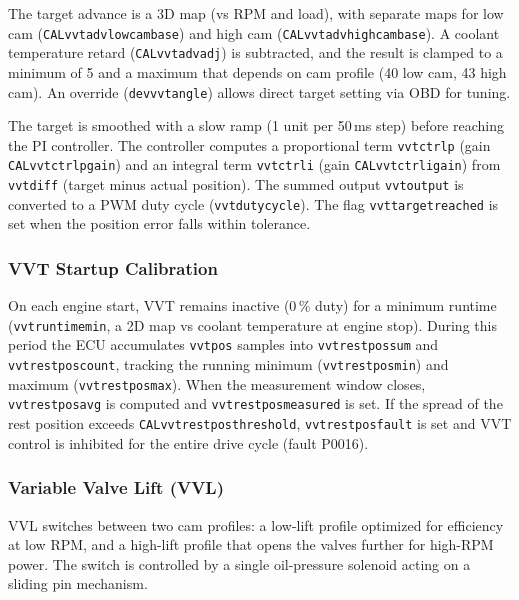 \documentclass[a4paper,11pt]{article}
\renewcommand{\_}{\oldunderscore\allowbreak}
\begin{document}
The target advance is a 3D map (vs RPM and load), with
separate maps for low cam (\texttt{CAL\_vvt\_adv\_low\_cam\_base}) and high
cam (\texttt{CAL\_vvt\_adv\_high\_cam\_base}). A coolant temperature retard
(\texttt{CAL\_vvt\_adv\_adj}) is subtracted, and the result is clamped to a
minimum of 5\textdegree{} and a maximum that depends on cam profile
(40\textdegree{} low cam, 43\textdegree{} high cam). An override
(\texttt{dev\_vvt\_angle}) allows direct target setting via OBD for tuning.

The target is smoothed with a slow ramp (1 unit per 50\,ms step) before
reaching the PI controller. The controller computes a proportional term
\texttt{vvt\_ctrl\_p} (gain \texttt{CAL\_vvt\_ctrl\_p\_gain}) and an integral
term \texttt{vvt\_ctrl\_i} (gain \texttt{CAL\_vvt\_ctrl\_i\_gain}) from
\texttt{vvt\_diff} (target minus actual position). The summed output
\texttt{vvt\_output} is converted to a PWM duty cycle
(\texttt{vvt\_duty\_cycle}). The flag \texttt{vvt\_target\_reached} is set
when the position error falls within tolerance.

\subsubsection*{VVT Startup Calibration}

On each engine start, VVT remains inactive (0\,\% duty) for a minimum runtime
(\texttt{vvt\_runtime\_min}, a 2D map vs coolant temperature at engine stop).
During this period the ECU accumulates \texttt{vvt\_pos} samples into
\texttt{vvt\_rest\_pos\_sum} and \texttt{vvt\_rest\_pos\_count}, tracking the
running minimum (\texttt{vvt\_rest\_pos\_min}) and maximum
(\texttt{vvt\_rest\_pos\_max}). When the measurement window closes,
\texttt{vvt\_rest\_pos\_avg} is computed and \texttt{vvt\_rest\_pos\_measured}
is set. If the spread of the rest position exceeds
\texttt{CAL\_vvt\_rest\_pos\_threshold}, \texttt{vvt\_rest\_pos\_fault} is set
and VVT control is inhibited for the entire drive cycle (fault P0016).

\subsubsection*{Variable Valve Lift (VVL)}

VVL switches between two cam profiles: a low-lift profile optimized for
efficiency at low RPM, and a high-lift profile that opens the valves further
for high-RPM power. The switch is controlled by a single oil-pressure
solenoid acting on a sliding pin mechanism.
\end{document}
